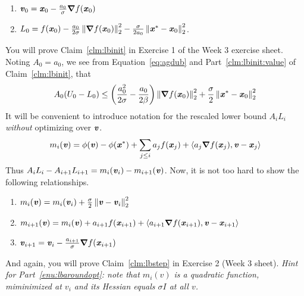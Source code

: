 \newpage

\begin{claim}
  \label{clm:lbinit}
  \noindent
  \begin{enumerate}
  \item $\boldsymbol{\mathit{v}}_0 = \boldsymbol{\mathit{x}}_0 - \frac{a_0}{\sigma} \boldsymbol{\nabla} f(\boldsymbol{\mathit{x}}_0)$
  \item
    \label{clm:lbinit:value}
    $L_0 = f(\boldsymbol{\mathit{x}}_0) - \frac{a_0}{2\sigma} \left\| \boldsymbol{\nabla} f(\boldsymbol{\mathit{x}}_0)
     \right\|_2^2 - \frac{\sigma }{2 a_0}\left\|  \boldsymbol{\mathit{x}}^* - \boldsymbol{\mathit{x}}_0 \right\|_2^2 $.
\end{enumerate}
\end{claim}
You will prove Claim~\ref{clm:lbinit} in Exercise 1 of the Week 3 exercise sheet.
Noting $A_0 = a_0$,
we see from Equation~\eqref{eq:agdub} and Part~\ref{clm:lbinit:value}
of Claim~\ref{clm:lbinit}, that
\begin{align}
 \label{eq:gapinit}
 A_0( U_0 - L_0 ) \leq
 \left(
 \frac{a_0^2}{2\sigma}
 -
   \frac{a_0}{2\beta}
 \right)
 \left\| \boldsymbol{\nabla} f(\boldsymbol{\mathit{x}}_0) \right\|_2^2
   +
   \frac{\sigma }{2}\left\|  \boldsymbol{\mathit{x}}^* - \boldsymbol{\mathit{x}}_0 \right\|_2^2
\end{align}
It will be convenient to introduce notation for the
rescaled lower bound $A_iL_i$ \emph{without} optimizing over $\boldsymbol{\mathit{v}}$.
\[
 m_i(\boldsymbol{\mathit{v}}) =
 \phi(\boldsymbol{\mathit{v}})
  - \phi(\boldsymbol{\mathit{x}}^*)
 +
 \sum_{j \leq i} a_j  f(\boldsymbol{\mathit{x}}_j)
   + \left<  a_j\boldsymbol{\nabla}
     f(\boldsymbol{\mathit{x}}_{j}) ,\boldsymbol{\mathit{v}} - \boldsymbol{\mathit{x}}_j \right>
 \]
Thus $A_iL_i-A_{i+1}L_{i+1} = m_{i}(\boldsymbol{\mathit{v}}_i) - m_{i+1}(\boldsymbol{\mathit{v}})$.
Now, it is not too hard to show the
following relationships.
\begin{claim}
 \label{clm:lbstep}
  \noindent
  \begin{enumerate}
  \item
    \label{enu:lbaroundopt}
    $ m_{i}(\boldsymbol{\mathit{v}}) = m_{i}(\boldsymbol{\mathit{v}}_i) + \frac{\sigma}{2} \left\|  \boldsymbol{\mathit{v}} -
  \boldsymbol{\mathit{v}}_i \right\|_2^2$
  \item  $m_{i+1}(\boldsymbol{\mathit{v}}) = m_{i}(\boldsymbol{\mathit{v}})
    + a_{i+1}  f(\boldsymbol{\mathit{x}}_{i+1})
    + \left<  a_{i+1}\boldsymbol{\nabla}
     f(\boldsymbol{\mathit{x}}_{i+1}) ,\boldsymbol{\mathit{v}} - \boldsymbol{\mathit{x}}_{i+1} \right>$
 \item  $\boldsymbol{\mathit{v}}_{i+1} = \boldsymbol{\mathit{v}}_i -  \frac{a_{i+1}}{\sigma} \boldsymbol{\nabla} f(\boldsymbol{\mathit{x}}_{i+1})$
  \end{enumerate}
\end{claim}
And again, you will prove Claim~\ref{clm:lbstep} in Exercise 2 (Week
3 sheet).
\emph{Hint for Part~\ref{enu:lbaroundopt}: note that $m_i(v)$ is a quadratic function, miminimized at $v_i$ and
 its Hessian equals $\sigma I$ at all $v$.}

